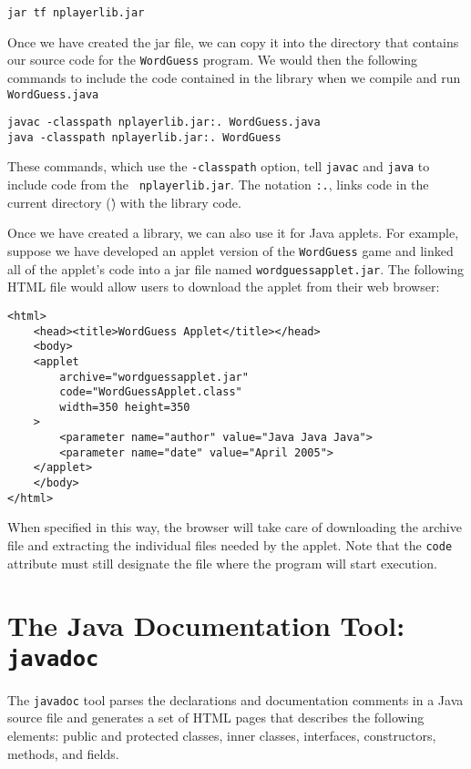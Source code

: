 \begin{jjjlisting}
\begin{lstlisting}
jar tf nplayerlib.jar
\end{lstlisting}
\end{jjjlisting}

\noindent Once we have created the jar file, we can copy it into the
directory that contains our source code for the {\tt WordGuess}
program.  We would then the following commands to include the code
contained in the library when we compile and run {\tt WordGuess.java}

\begin{jjjlisting}
\begin{lstlisting}
javac -classpath nplayerlib.jar:. WordGuess.java
java -classpath nplayerlib.jar:. WordGuess
\end{lstlisting}
\end{jjjlisting}

\noindent These commands, which use the {\tt -classpath} option,
tell {\tt javac} and {\tt java} to include code from the {\tt
nplayerlib.jar}. The notation \verb|:.|, links code in the current
directory (\.) with the library code.

Once we have created a library, we can also use it for
Java applets.  For example, suppose we have developed an applet
version of the {\tt WordGuess}  game and linked all of the
applet's code into a jar file named {\tt wordguessapplet.jar}.
The following HTML file would allow users to download the applet
from their web browser:

\begin{jjjlisting}
\begin{lstlisting}
<html>
    <head><title>WordGuess Applet</title></head>
    <body>
    <applet
        archive="wordguessapplet.jar"
        code="WordGuessApplet.class"
        width=350 height=350
    >
        <parameter name="author" value="Java Java Java">
        <parameter name="date" value="April 2005">
    </applet>
    </body>
</html>
\end{lstlisting}
\end{jjjlisting}

\noindent When specified in this way, the browser will take care
of downloading the archive file and extracting the individual files
needed by the applet.  Note that the {\tt code} attribute must still
designate the file where the program will start execution.

\section*{The Java Documentation Tool: {\tt javadoc}}
\label{the-java-documentation-tool}
\noindent The {\tt javadoc} tool parses the declarations and documentation
comments in a Java source file and generates a set of HTML pages that
describes the following elements: public and protected classes, inner
classes, interfaces, constructors, methods, and fields.

